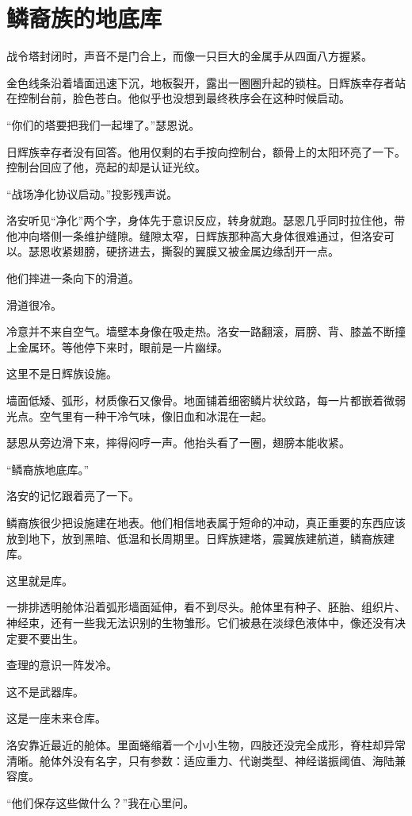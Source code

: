 \chapter{鳞裔族的地底库}

战令塔封闭时，声音不是门合上，而像一只巨大的金属手从四面八方握紧。

金色线条沿着墙面迅速下沉，地板裂开，露出一圈圈升起的锁柱。日辉族幸存者站在控制台前，脸色苍白。他似乎也没想到最终秩序会在这种时候启动。

“你们的塔要把我们一起埋了。”瑟恩说。

日辉族幸存者没有回答。他用仅剩的右手按向控制台，额骨上的太阳环亮了一下。控制台回应了他，亮起的却是认证光纹。

“战场净化协议启动。”投影残声说。

洛安听见“净化”两个字，身体先于意识反应，转身就跑。瑟恩几乎同时拉住他，带他冲向塔侧一条维护缝隙。缝隙太窄，日辉族那种高大身体很难通过，但洛安可以。瑟恩收紧翅膀，硬挤进去，撕裂的翼膜又被金属边缘刮开一点。

他们摔进一条向下的滑道。

滑道很冷。

冷意并不来自空气。墙壁本身像在吸走热。洛安一路翻滚，肩膀、背、膝盖不断撞上金属环。等他停下来时，眼前是一片幽绿。

这里不是日辉族设施。

墙面低矮、弧形，材质像石又像骨。地面铺着细密鳞片状纹路，每一片都嵌着微弱光点。空气里有一种干冷气味，像旧血和冰混在一起。

瑟恩从旁边滑下来，摔得闷哼一声。他抬头看了一圈，翅膀本能收紧。

“鳞裔族地底库。”

洛安的记忆跟着亮了一下。

鳞裔族很少把设施建在地表。他们相信地表属于短命的冲动，真正重要的东西应该放到地下，放到黑暗、低温和长周期里。日辉族建塔，震翼族建航道，鳞裔族建库。

这里就是库。

一排排透明舱体沿着弧形墙面延伸，看不到尽头。舱体里有种子、胚胎、组织片、神经束，还有一些我无法识别的生物雏形。它们被悬在淡绿色液体中，像还没有决定要不要出生。

查理的意识一阵发冷。

这不是武器库。

这是一座未来仓库。

洛安靠近最近的舱体。里面蜷缩着一个小小生物，四肢还没完全成形，脊柱却异常清晰。舱体外没有名字，只有参数：适应重力、代谢类型、神经谐振阈值、海陆兼容度。

“他们保存这些做什么？”我在心里问。

